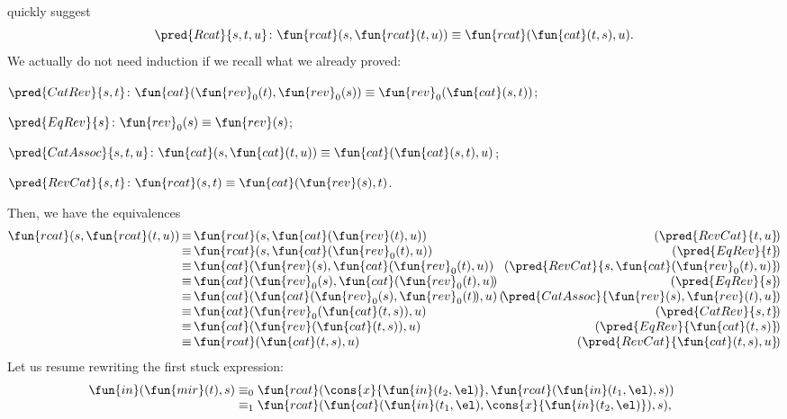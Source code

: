 quickly suggest
\begin{equation*}
  \pred{Rcat}{s,t,u} \colon \fun{rcat}(s,\fun{rcat}(t,u)) \equiv \fun{rcat}(\fun{cat}(t,s),u).
\end{equation*}
We actually do not need induction if we recall what we already proved:
\begin{itemize*}

  \item \(\pred{CatRev}{s,t} \colon \fun{cat}(\fun{rev}_0(t),
    \fun{rev}_0(s)) \equiv \fun{rev}_0(\fun{cat}(s,t))\);

  \item \(\pred{EqRev}{s} \colon \fun{rev}_0(s) \equiv \fun{rev}(s)\);

  \item \(\pred{CatAssoc}{s,t,u} \colon \fun{cat}(s,\fun{cat}(t,u))
    \equiv \fun{cat}(\fun{cat}(s,t),u)\);

  \item \(\pred{RevCat}{s,t} \colon \fun{rcat}(s,t) \equiv
    \fun{cat}(\fun{rev}(s),t)\).

\end{itemize*}
Then, we have the equivalences
\begin{equation*}
\begin{array}{@{}r@{\,}c@{\,}l@{\,}r@{}}
\fun{rcat}(s,\fun{rcat}(t,u))
& \equiv & \fun{rcat}(s,\fun{cat}(\fun{rev}(t),u))
& (\pred{RevCat}{t,u}\!)\\
& \equiv & \fun{rcat}(s,\fun{cat}(\fun{rev}_0(t),u))
& (\pred{EqRev}{t}\!)\\
& \equiv & \fun{cat}(\fun{rev}(s),\fun{cat}(\fun{rev}_0(t),u))
& (\pred{RevCat}{s,\fun{cat}(\fun{rev}_0(t),u)}\!)\\
& \equiv & \fun{cat}(\fun{rev}_0(s),\fun{cat}(\fun{rev}_0(t),u)\!)
& (\pred{EqRev}{s}\!)\\
& \equiv & \fun{cat}(\fun{cat}(\fun{rev}_0(s),\fun{rev}_0(t)\!),u)\!\!
& (\!\pred{CatAssoc}{\fun{rev}(s),\fun{rev}(t),u}\!)\\
& \equiv & \fun{cat}(\fun{rev}_0(\fun{cat}(t,s)),u)
& (\pred{CatRev}{s,t}\!)\\
& \equiv & \fun{cat}(\fun{rev}(\fun{cat}(t,s)),u)
& (\pred{EqRev}{\fun{cat}(t,s)}\!)\\
& \equiv & \fun{rcat}(\fun{cat}(t,s),u)
& (\pred{RevCat}{\fun{cat}(t,s),u}\!)
\end{array}
\end{equation*}
Let us resume rewriting the first stuck expression:
\begin{equation*}
\begin{array}{@{}r@{\;}c@{\;}l@{\qquad}r@{}}
\fun{in}(\fun{mir}(t),s)
& \equiv_0
& \fun{rcat}(\cons{x}{\fun{in}(t_2,\el)},
  \fun{rcat}(\fun{in}(t_1,\el),s))\\
& \equiv_1
& \fun{rcat}(\fun{cat}(\fun{in}(t_1,\el),
  \cons{x}{\fun{in}(t_2,\el)}), s),\index{rcat@\fun{rcat/2}|)}
\end{array}
\end{equation*}
